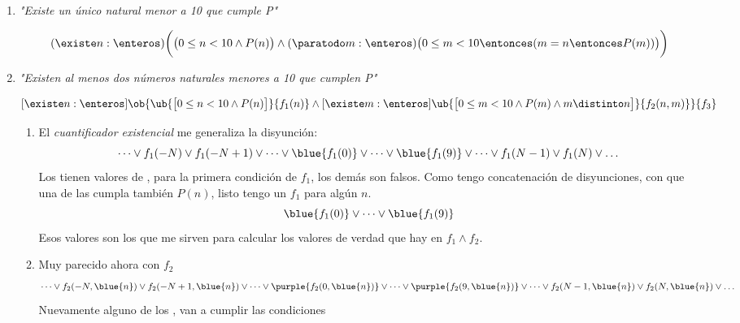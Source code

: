 \begin{enumerate}[label=\tiny\faIcon{yin-yang}$_{\arabic*}$]
  \item \textit{"Existe un único natural menor a 10 que cumple P"}\par
        $$
          (\existe n : \enteros)
          \biggl(
          \bigl(
          0 \leq n < 10 \land P(n)
          \bigr)
          \land
          (\paratodo m : \enteros) \bigl(0 \leq m < 10  \entonces (m = n \entonces P(m))  \bigr) \biggr)
        $$

  \item \textit{"Existen al menos dos números naturales menores a 10 que cumplen P"}

        $$
          [\existe n: \enteros]
          \ob{
            \ub{\bigl[ 0 \leq n < 10 \land P(n) \bigr]}{f_1(n)}
            \land
            [\existe m: \enteros]
            \ub{\bigl[ 0 \leq m < 10 \land P(m) \land m \distinto n \bigr]}{f_2(n,m)}
          }{f_3}
        $$
        \begin{enumerate}[label=\tiny\faIcon{meh-rolling-eyes}]
          \item El \textit{cuantificador existencial} me generaliza la disyunción:
                $$
                  \dots
                  \lor f_1(-N)
                  \lor f_1(-N+1)
                  \lor\dots
                  \lor \blue{f_1(0)}
                  \lor\dots
                  \lor \blue{f_1(9)}
                  \lor\dots
                  \lor f_1(N-1)
                  \lor f_1(N)
                  \lor\dots
                $$
                Los  tienen valores de \verdadero, para la primera condición de $f_1$, los demás son falsos.
                Como tengo concatenación de disyunciones, con que una de las  cumpla también $P(n)$, listo tengo un $f_1$
                \verdadero para algún $n$.
                $$
                  \blue{f_1(0)}
                  \lor\dots
                  \lor \blue{f_1(9)}
                $$
                Esos valores son los que me sirven para calcular los valores de verdad que hay en $f_1 \land f_2$.

          \item Muy parecido ahora con $f_2$
                $$
                  \dots
                  \lor f_2(-N, \blue{n})
                  \lor f_2(-N+1, \blue{n})
                  \lor\dots
                  \lor \purple{f_2(0, \blue{n})}
                  \lor\dots
                  \lor \purple{f_2(9, \blue{n})}
                  \lor\dots
                  \lor f_2(N-1, \blue{n})
                  \lor f_2(N, \blue{n})
                  \lor\dots
                $$
                Nuevamente alguno de los , van a cumplir las condiciones 


\end{enumerate}
\end{enumerate}
